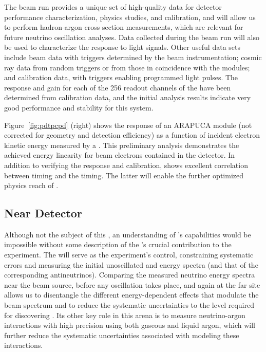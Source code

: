   The  beam run provides a unique set of high-quality data for detector performance characterization, physics studies, and calibration, and will 
allow us to perform hadron-argon cross section measurements, which are relevant for future  neutrino oscillation analyses.
Data collected during the beam run will also be used to characterize the  response to light signals. Other useful data sets include
beam data with triggers determined by the beam instrumentation; cosmic ray data  from random triggers or from those in coincidence with the  modules; and calibration data, with triggers enabling programmed light pulses. 
The %
response and gain for each of the 256 readout channels of the  have been determined from calibration data, and 
the initial analysis results indicate very good performance and stability for this system. 

Figure~\ref{fig:pdtpcpd} (right) shows the response of an %
ARAPUCA  module (not corrected for geometry and detection efficiency) as a function of incident electron kinetic energy measured by a . 
 This preliminary analysis demonstrates the achieved energy linearity for beam electrons contained in the detector.  
In addition to verifying the  response and calibration,  shows excellent correlation between  timing and the  timing. The latter will enable the further optimized physics reach of . 




\subsection{Near Detector}
\label{sec:nd-verview}

Although not the subject of this , an understanding of 's capabilities would be impossible without 
some description of the  's crucial contribution  to the experiment.
The  will serve as the experiment's control,
 constraining systematic errors and measuring the initial unoscillated \numu and \nue energy spectra (and that of the corresponding antineutrinos). 
Comparing the measured neutrino energy spectra near the beam source, before any oscillation takes place, and again at the far site allows us to disentangle the different energy-dependent effects that modulate the beam spectrum and to reduce the systematic uncertainties to the level required for discovering . Its other key role in this arena is to measure neutrino-argon interactions with high precision using both gaseous and liquid argon, which will further reduce the systematic uncertainties associated with modeling these interactions. 

